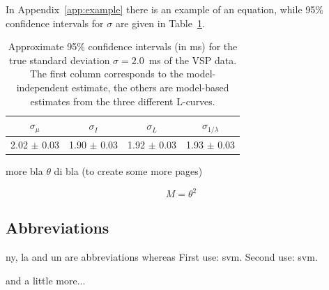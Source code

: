 In Appendix~\ref{app:example} there is an example of an equation,
while 95\% confidence intervals for $\sigma$ are given in
Table~\ref{table:sigma}.
\begin{table}
  \caption{Approximate 95\% confidence intervals (in ms) for the true 
    standard deviation $\sigma=2.0$~ms of the VSP data. 
    The first column corresponds to the model-independent estimate, 
    the others are model-based estimates from the three different L-curves.} 
  \begin{center} 
    \begin{tabular}{|c|c|c|c|}\hline 
      $\sigma_\mu$  & $\sigma_I$ &$\sigma_{L}$  &$\sigma_{1/\lambda}$  \\
      \hline  
      2.02 $\pm$ 0.03 & 1.90 $\pm$ 0.03  & 1.92 $\pm$ 0.03 & 1.93 $\pm$ 0.03 
      \\ \hline 
    \end{tabular} 
    \label{table:sigma} 
  \end{center} 
\end{table} 

\newpage

more bla $\theta$ di bla (to create some more pages)

\begin{equation}
    M = \theta ^2
\end{equation}


\subsection{Abbreviations}

\gls{ny}, \gls{la} and \gls{un} are abbreviations whereas
First use: \gls{svm}. Second use: \gls{svm}.



\newpage 

and a little more...


